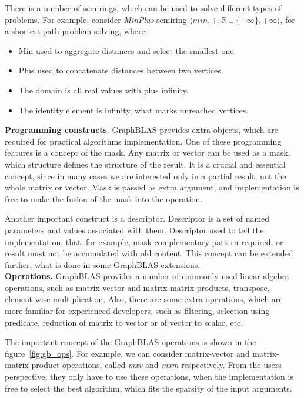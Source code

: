 There is a number of semirings, which can be used to solve different types of problems. For example, consider \textit{MinPlus} semiring $\langle min, +, \mathbb{R} \cup \{+\infty\}, +\infty \rangle$, for a shortest path problem solving, where:

\begin{itemize}
    \item Min used to aggregate distances and select the smallest one.
    \item Plus used to concatenate distances between two vertices.
    \item The domain is all real values with plus infinity.
    \item The identity element is infinity, what marks unreached vertices.
\end{itemize}

\textbf{Programming constructs}. GraphBLAS provides extra objects, which are required for practical algorithms implementation. One of these programming features is a concept of the mask. Any matrix or vector can be used as a mask, which structure defines the structure of the result. It is a crucial and essential concept, since in many cases we are interested only in a partial result, not the whole matrix or vector. Mask is passed as extra argument, and implementation is free to make the fusion of the mask into the operation.

Another important construct is a descriptor. Descriptor is a set of named parameters and values associated with them. Descriptor used to tell the implementation, that, for example, mask complementary pattern required, or result must not be accumulated with old content. This concept can be extended further, what is done in some GraphBLAS extensions.\\

\textbf{Operations.} GraphBLAS provides a number of commonly used linear algebra operations, such as matrix-vector and matrix-matrix products, transpose, element-wise multiplication. Also, there are some extra operations, which are more familiar for experienced developers, such as filtering, selection using predicate, reduction of matrix to vector or of vector to scalar, etc.

The important concept of the GraphBLAS operations is shown in the figure~\ref{fig:gb_ops}. For example, we can consider matrix-vector and matrix-matrix product operations, called \textit{mxv} and \textit{mxm} respectively. From the users perspective, they only have to use these operations, when the implementation is free to select the best algorithm, which fits the sparsity of the input arguments.\\

